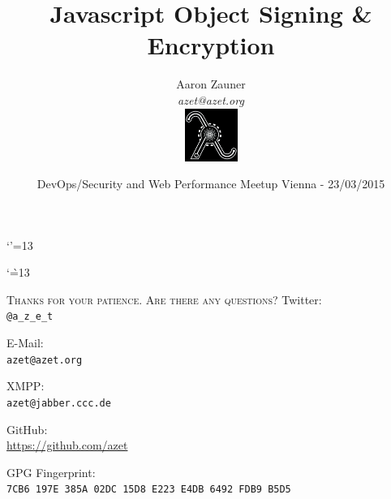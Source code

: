 \documentclass[hyperref={draft}]{beamer}
\title{Javascript Object Signing \& Encryption}
\author[Aaron Zauner]{Aaron Zauner\\
        \textit{azet@azet.org}\\
        \includegraphics[height=65px,width=65px]{lambda}
       }
\institute{lambda.co.at:\\Highly-Available, Scalable \& Secure Distributed Systems}
\date{DevOps/Security and Web Performance Meetup Vienna - 23/03/2015}
\begin{document}
\makeatletter
\let \@sverbatim \@verbatim
\def \@verbatim {\@sverbatim \verbatimplus}
{\catcode`'=13 \gdef \verbatimplus{\catcode`'=13 \chardef '=13 }} 
\makeatother

\makeatletter
{\catcode`\`=13
\xdef\@verbatim{\unexpanded\expandafter{\@verbatim}\chardef\noexpand`=18 }
}
\makeatother

{

\begin{frame}
  \titlepage
\end{frame}

}
\addtocounter{framenumber}{-1}

{

\begin{frame}
  \tableofcontents
\end{frame}

}
\addtocounter{framenumber}{-1}





\begin{frame}
  \begin{center}
    \textsc{Thanks for your patience. Are there any questions?}
    \vfill
    Twitter:\\
    \texttt{@a\_z\_e\_t}

    \vfill
    E-Mail:\\
    \texttt{azet@azet.org}

    \vfill
    XMPP:\\
    \texttt{azet@jabber.ccc.de}

    \vfill
    GitHub:\\
    \url{https://github.com/azet}

    \vfill
    GPG Fingerprint:\\
    \texttt{7CB6 197E 385A 02DC 15D8 E223 E4DB 6492 FDB9 B5D5}
  \end{center}
\end{frame}


\end{document}

